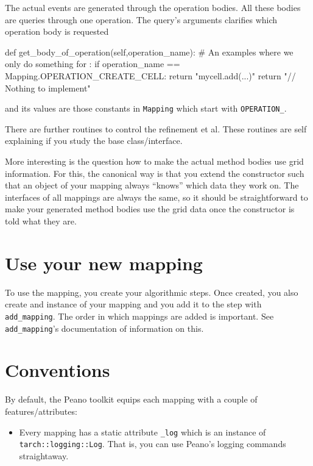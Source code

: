 \noindent
The actual events are generated through the operation bodies.
All these bodies are queries through one operation. 
The query's arguments clarifies which operation body is requested

\begin{code}
  def get_body_of_operation(self,operation_name):
    # An examples where we only do something for :
    if operation_name == Mapping.OPERATION_CREATE_CELL:
      return "mycell.add(...)\n"
    return "// Nothing to implement\n"
\end{code}

\noindent
and its values are those constants in \texttt{Mapping} which start with
\texttt{OPERATION\_}.


There are further routines to control the refinement et al.
These routines are self explaining if you study the base class/interface.


More interesting is the question how to make the actual method bodies use grid
information.
For this, the canonical way is that you extend the constructor such that an
object of your mapping always ``knows'' which data they work on. 
The interfaces of all mappings are always the same, so it should be
straightforward to make your generated method bodies use the grid data once the
constructor is told what they are.


\section{Use your new mapping}

To use the mapping, you create your algorithmic steps.
Once created, you also create and instance of your mapping and you add it to the
step with \texttt{add\_mapping}.
The order in which mappings are added is important.
See \texttt{add\_mapping}'s documentation of information on this.



\section{Conventions}

By default, the Peano toolkit equips each mapping with a couple of
features/attributes:

\begin{itemize}
  \item Every mapping has a static attribute \texttt{\_log} which is an instance
  of \texttt{tarch::logging::Log}. That is, you can use Peano's logging commands
  straightaway.
\end{itemize}

